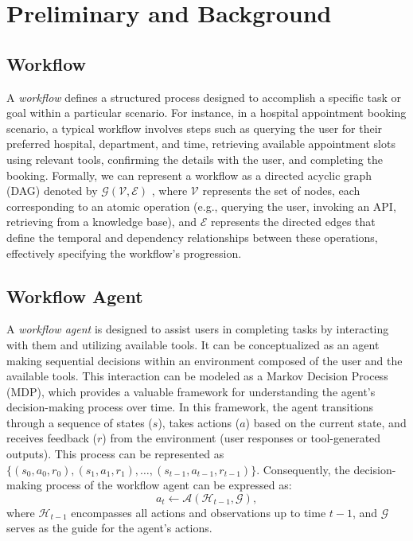 
\section{Preliminary and Background} \label{sec:prelim}
\subsection{Workflow}

A \emph{workflow} defines a structured process designed to accomplish a specific task or goal within a particular scenario. For instance, in a hospital appointment booking scenario, a typical workflow involves steps such as querying the user for their preferred hospital, department, and time, retrieving available appointment slots using relevant tools, confirming the details with the user, and completing the booking. 
Formally, we can represent a workflow as a directed acyclic graph (DAG) denoted by $\mathcal{G}(\mathcal{V}, \mathcal{E})$ \citep{WorFBench,AFlow}, where $\mathcal{V}$ represents the set of nodes, each corresponding to an atomic operation (e.g., querying the user, invoking an API, retrieving from a knowledge base), and $\mathcal{E}$ represents the directed edges that define the temporal and dependency relationships between these operations, effectively specifying the workflow's progression.


\subsection{Workflow Agent} \label{subsec:workflow-agent}
A \emph{workflow agent} is designed to assist users in completing tasks by interacting with them and utilizing available tools. It can be conceptualized as an agent making sequential decisions within an environment composed of the user and the available tools. This interaction can be modeled as a Markov Decision Process (MDP), which provides a valuable framework for understanding the agent's decision-making process over time. In this framework, the agent transitions through a sequence of states ($s$), takes actions ($a$) based on the current state, and receives feedback ($r$) from the environment (user responses or tool-generated outputs). This process can be represented as $\{(s_{0}, a_{0}, r_{0}), (s_{1}, a_{1}, r_{1}), \dots, (s_{t-1}, a_{t-1}, r_{t-1})\}$. Consequently, the decision-making process of the workflow agent can be expressed as:
\begin{equation}
    a_t \leftarrow \mathcal{A}(\mathcal{H}_{t-1}, \mathcal{G}),
\end{equation}
where $\mathcal{H}_{t-1}$ encompasses all actions and observations up to time $t-1$, and $\mathcal{G}$ serves as the guide for the agent's actions.

